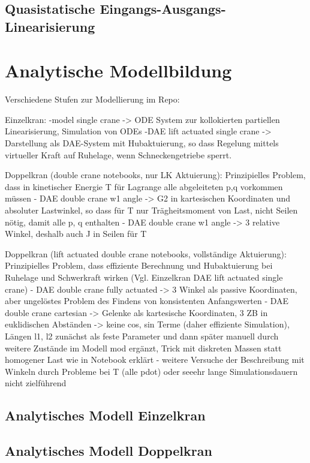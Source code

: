 \section{Quasistatische Eingangs-Ausgangs-Linearisierung} 

\chapter{Analytische Modellbildung}

Verschiedene Stufen zur Modellierung im Repo:

Einzelkran:
-model single crane -> ODE System zur kollokierten partiellen Linearisierung, Simulation von ODEs
-DAE lift actuated single crane -> Darstellung als DAE-System mit Hubaktuierung, so dass Regelung mittels virtueller Kraft auf Ruhelage, wenn Schneckengetriebe sperrt.

Doppelkran (double crane notebooks, nur LK Aktuierung):
Prinzipielles Problem, dass in kinetischer Energie T für Lagrange alle abgeleiteten p,q vorkommen müssen
- DAE double crane w1 angle -> G2 in kartesischen Koordinaten und absoluter Lastwinkel, so dass für T nur Trägheitsmoment von Last, nicht Seilen nötig, damit alle p, q enthalten
- DAE double crane w1 angle -> 3 relative Winkel, deshalb auch J in Seilen für T

Doppelkran (lift actuated double crane notebooks, vollständige Aktuierung):
Prinzipielles Problem, dass effiziente Berechnung und Hubaktuierung bei Ruhelage und Schwerkraft wirken (Vgl. Einzelkran DAE lift actuated single crane)
- DAE double crane fully actuated -> 3 Winkel als passive Koordinaten, aber ungelöstes Problem des Findens von konsistenten Anfangswerten
- DAE double crane cartesian -> Gelenke als kartesische Koordinaten, 3 ZB in euklidischen Abständen -> keine cos, sin Terme (daher effiziente Simulation), Längen l1, l2 zunächst als feste Parameter und dann später manuell durch weitere Zustände im Modell mod ergänzt, Trick mit diskreten Massen statt homogener Last wie in Notebook erklärt
- weitere Versuche der Beschreibung mit Winkeln durch Probleme bei T (alle pdot) oder seeehr lange Simulationsdauern nicht zielführend

\section{Analytisches Modell Einzelkran}

\section{Analytisches Modell Doppelkran}

